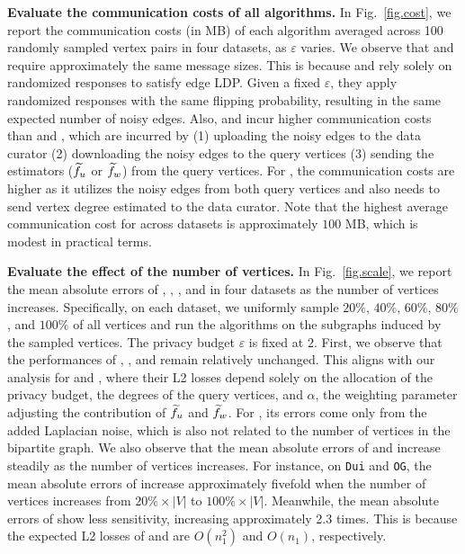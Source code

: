 \noindent
\textbf{Evaluate the communication costs of all algorithms.}
{
In Fig.~\ref{fig.cost}, we report the communication costs (in MB) of each algorithm averaged across 100 randomly sampled vertex pairs in four datasets, as $\varepsilon$ varies. 
We observe that \naive and \bs require approximately the same message sizes. 
This is because \naive and \bs rely solely on randomized responses to satisfy edge LDP. Given a fixed $\varepsilon$, they apply randomized responses with the same flipping probability, resulting in the same expected number of noisy edges.
Also, \advss and \advds incur higher communication costs than \naive and \bs, 
which are incurred by 
(1) uploading the noisy edges to the data curator
(2) downloading the noisy edges to the query vertices 
(3) sending the estimators ($\widetilde{f}_u$ or $\widetilde{f}_w$) from the query vertices. 
For \advds, the communication costs are higher as it utilizes the noisy edges from both query vertices and also needs to send vertex degree estimated to the data curator. 
Note that the highest average communication cost for \advds across datasets is approximately $100$ MB, which is modest in practical terms. 
}


\noindent
\textbf{Evaluate the effect of the number of vertices.}
{
In Fig.~\ref{fig.scale}, we report the mean absolute errors of \cdp, \naive, \bs, \advss and \advds in four datasets as the number of vertices increases. 
Specifically, on each dataset, we uniformly sample $20\%$, $40\%$, $60\%$, $80\%$, and $100\%$ of all vertices and run the algorithms on the subgraphs induced by the sampled vertices. The privacy budget $\varepsilon$ is fixed at $2$. 
First, we observe that the performances of \cdp, \advss, and \advds remain relatively unchanged. 
This aligns with our analysis for \advss and \advds, where their L2 losses depend solely on the allocation of the privacy budget, the degrees of the query vertices, and $\alpha$, the weighting parameter adjusting the contribution of $\widetilde{f}_u$ and $\widetilde{f}_w$. 
For \cdp, its errors come only from the added Laplacian noise, which is also not related to the number of vertices in the bipartite graph. 
We also observe that the mean absolute errors of \naive and \bs increase steadily as the number of vertices increases. 
For instance, on \texttt{Dui} and \texttt{OG}, the mean absolute errors of \naive increase approximately fivefold when the number of vertices increases from $20\% \times |V|$ to $100\% \times  |V|$. 
Meanwhile, the mean absolute errors of \bs show less sensitivity, increasing approximately 2.3 times. 
This is because the expected L2 losses of \naive and \bs are $O(n_1^2)$ and $O(n_1)$, respectively. }
